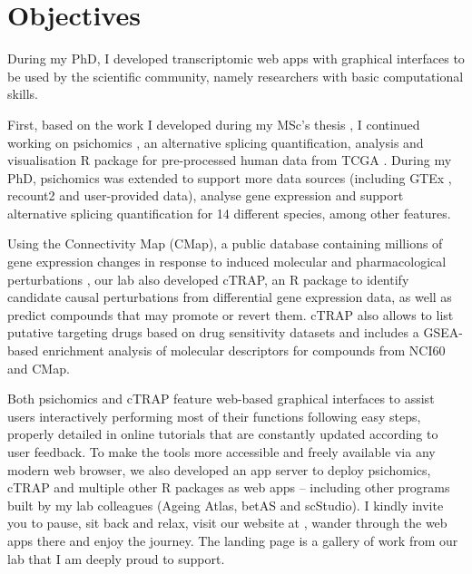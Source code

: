 \chapter{Objectives}

During my PhD, I developed transcriptomic web apps with graphical interfaces to be used by the scientific community, namely researchers with basic computational skills.

First, based on the work I developed during my MSc's thesis \cite{saraiva-agostinho:2016vw}, I continued working on psichomics \cite{saraiva-agostinho:2018uq,saraiva-agostinho:2020wz}, an alternative splicing quantification, analysis and visualisation R package for pre-processed human data from TCGA \cite{chang:2013ww}. During my PhD, psichomics was extended to support more data sources (including GTEx \cite{lonsdale:2013uo}, recount2 \cite{collado-torres:2017uw} and user-provided data), analyse gene expression and support alternative splicing quantification for 14 different species, among other features.

Using the Connectivity Map (CMap), a public database containing millions of gene expression changes in response to induced molecular and pharmacological perturbations \cite{subramanian:2017ul}, our lab also developed cTRAP, an R package to identify candidate causal perturbations from differential gene expression data, as well as predict compounds that may promote or revert them. cTRAP also allows to list putative targeting drugs based on drug sensitivity datasets and includes a GSEA-based enrichment analysis of molecular descriptors for compounds from NCI60 and CMap.

Both psichomics and cTRAP feature web-based graphical interfaces to assist users interactively performing most of their functions following easy steps, properly detailed in online tutorials that are constantly updated according to user feedback. To make the tools more accessible and freely available via any modern web browser, we also developed an app server to deploy psichomics, cTRAP and multiple other R packages as web apps -- including other programs built by my lab colleagues (Ageing Atlas, betAS and scStudio). I kindly invite you to pause, sit back and relax, visit our website at , wander through the web apps there and enjoy the journey. The landing page is a gallery of work from our lab that I am deeply proud to support.

